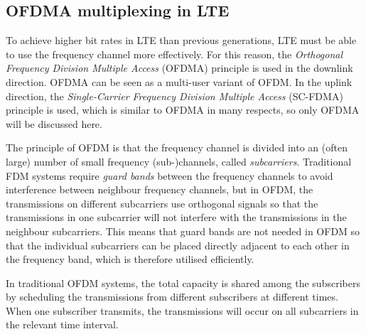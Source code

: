 \begin{itemize}
%
\end{itemize}

\subsection{OFDMA multiplexing in LTE}\label{sec:ltemux}\label{sec:ofdma}
To achieve higher bit rates in LTE than previous generations, LTE must be able to use the frequency channel more effectively. For this reason, the \emph{Orthogonal Frequency Division Multiple Access} (OFDMA) principle is used in the downlink direction. OFDMA can be seen as a multi-user variant of OFDM. In the uplink direction, the \emph{Single-Carrier Frequency Division Multiple Access} (SC-FDMA) principle is used, which is similar to OFDMA in many respects, so only OFDMA will be discussed here.

The principle of OFDM is that the frequency channel is divided into an (often large) number of small frequency (sub-)channels, called \emph{subcarriers}. Traditional FDM systems require \emph{guard bands} between the frequency channels to avoid interference between neighbour frequency channels, but in OFDM, the transmissions on different subcarriers use orthogonal signals so that the transmissions in one subcarrier will not interfere with the transmissions in the neighbour subcarriers. This means that guard bands are not needed in OFDM so that the individual subcarriers can be placed directly adjacent to each other in the frequency band, which is therefore utilised efficiently.

In traditional OFDM systems, the total capacity is shared among the subscribers by scheduling the transmissions from different subscribers at different times. When one subscriber transmits, the transmissions will occur on all subcarriers in the relevant time interval.

